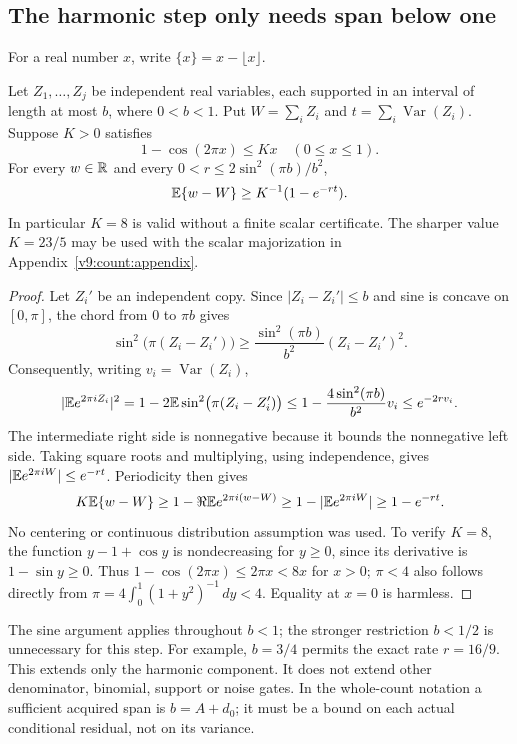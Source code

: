 \subsection{The harmonic step only needs span below one}\label{v9:harmonic:section}
For a real number $x$, write $\{x\}=x-\lfloor x\rfloor$.

\begin{lemma}\label{v9:harmonic:span}
Let $Z_1,\ldots,Z_j$ be independent real variables, each supported in an
interval of length at most $b$, where $0<b<1$.
Put $W=\sum_i Z_i$ and $t=\sum_i\operatorname{Var}(Z_i)$.
Suppose $K>0$ satisfies
\[
                  1-\cos(2\pi x)\le Kx\quad(0\le x\le1).
\]
For every $w\in\mathbb R$ and every
$0<r\le2\sin^2(\pi b)/b^2$,
\begin{equation}\label{v9:harmonic:gain}
                     \mathbb E\{w-W\}\ge K^{-1}(1-e^{-rt}).
\end{equation}
In particular $K=8$ is valid without a finite scalar certificate.
The sharper value $K=23/5$ may be used with the scalar majorization in
Appendix~\ref{v9:count:appendix}.
\end{lemma}
\begin{proof}
Let $Z_i'$ be an independent copy. Since $|Z_i-Z_i'|\le b$ and sine is
concave on $[0,\pi]$, the chord from $0$ to $\pi b$ gives
\[
 \sin^2\bigl(\pi(Z_i-Z_i')\bigr)
 \ge\frac{\sin^2(\pi b)}{b^2}(Z_i-Z_i')^2.
\]
Consequently, writing $v_i=\operatorname{Var}(Z_i)$,
\[
 |\mathbb E e^{2\pi iZ_i}|^2
 =1-2\mathbb E\sin^2\bigl(\pi(Z_i-Z_i')\bigr)
 \le1-\frac{4\sin^2(\pi b)}{b^2}v_i
 \le e^{-2rv_i}.
\]
The intermediate right side is nonnegative because it bounds the
nonnegative left side. Taking square roots and multiplying, using
independence, gives $|\mathbb E e^{2\pi iW}|\le e^{-rt}$. Periodicity then gives
\[
 K\mathbb E\{w-W\}\ge1-\Re\mathbb E e^{2\pi i(w-W)}
                \ge1-|\mathbb E e^{2\pi iW}|\ge1-e^{-rt}.
\]
No centering or continuous distribution assumption was used. To verify
$K=8$, the function $y-1+\cos y$ is nondecreasing for $y\ge0$, since its
derivative is $1-\sin y\ge0$. Thus $1-\cos(2\pi x)\le2\pi x<8x$ for
$x>0$; $\pi<4$ also follows directly from
$\pi=4\int_0^1(1+y^2)^{-1}\,dy<4$. Equality at $x=0$ is harmless.
\end{proof}

The sine argument applies throughout $b<1$; the stronger restriction
$b<1/2$ is unnecessary for this step. For example,
$b=3/4$ permits the exact rate $r=16/9$.
This extends only the harmonic component. It does not extend other
denominator, binomial, support or noise gates. In the whole-count
notation a sufficient acquired span is $b=A+d_0$; it must be a bound on
each actual conditional residual, not on its variance.

